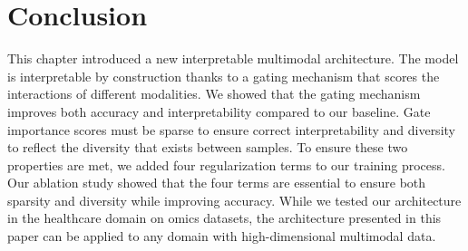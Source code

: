 \documentclass[../main.tex]{subfiles}
\begin{document}
\section{Conclusion}
 This chapter introduced a new interpretable multimodal architecture.
 The model is interpretable by construction thanks to a gating mechanism that scores the interactions of different modalities.
 We showed that the gating mechanism improves both accuracy and interpretability compared to our baseline.
 Gate importance scores must be sparse to ensure correct interpretability and diversity to reflect the diversity that exists between samples.
 To ensure these two properties are met, we added four regularization terms to our training process.
 Our ablation study showed that the four terms are essential to ensure both sparsity and diversity while improving accuracy.
 While we tested our architecture in the healthcare domain on omics datasets, the architecture presented in this paper can be applied to any domain with high-dimensional multimodal data.
\end{document}
